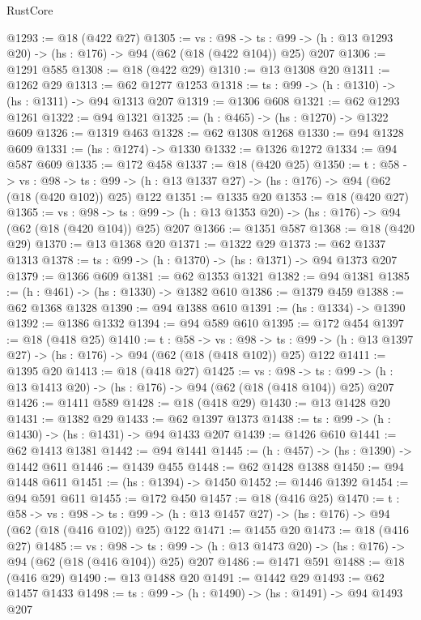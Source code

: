 \begin{lexlean}{RustCore}
\begin{coremodule}
@1293 := @18 (@422 @27)
@1305 := {vs : @98} ->
  {ts : @99} -> (h : @13 @1293 @20) -> (hs : @176) -> @94 (@62 (@18 (@422 @104)) @25) @207
@1306 := @1291 @585
@1308 := @18 (@422 @29)
@1310 := @13 @1308 @20
@1311 := @1262 @29
@1313 := @62 @1277 @1253
@1318 := {ts : @99} -> (h : @1310) -> (hs : @1311) -> @94 @1313 @207
@1319 := @1306 @608
@1321 := @62 @1293 @1261
@1322 := @94 @1321
@1325 := (h : @465) -> (hs : @1270) -> @1322 @609
@1326 := @1319 @463
@1328 := @62 @1308 @1268
@1330 := @94 @1328 @609
@1331 := (hs : @1274) -> @1330
@1332 := @1326 @1272
@1334 := @94 @587 @609
@1335 := @172 @458
@1337 := @18 (@420 @25)
@1350 := {t : @58} ->
  {vs : @98} ->
  {ts : @99} -> (h : @13 @1337 @27) -> (hs : @176) -> @94 (@62 (@18 (@420 @102)) @25) @122
@1351 := @1335 @20
@1353 := @18 (@420 @27)
@1365 := {vs : @98} ->
  {ts : @99} -> (h : @13 @1353 @20) -> (hs : @176) -> @94 (@62 (@18 (@420 @104)) @25) @207
@1366 := @1351 @587
@1368 := @18 (@420 @29)
@1370 := @13 @1368 @20
@1371 := @1322 @29
@1373 := @62 @1337 @1313
@1378 := {ts : @99} -> (h : @1370) -> (hs : @1371) -> @94 @1373 @207
@1379 := @1366 @609
@1381 := @62 @1353 @1321
@1382 := @94 @1381
@1385 := (h : @461) -> (hs : @1330) -> @1382 @610
@1386 := @1379 @459
@1388 := @62 @1368 @1328
@1390 := @94 @1388 @610
@1391 := (hs : @1334) -> @1390
@1392 := @1386 @1332
@1394 := @94 @589 @610
@1395 := @172 @454
@1397 := @18 (@418 @25)
@1410 := {t : @58} ->
  {vs : @98} ->
  {ts : @99} -> (h : @13 @1397 @27) -> (hs : @176) -> @94 (@62 (@18 (@418 @102)) @25) @122
@1411 := @1395 @20
@1413 := @18 (@418 @27)
@1425 := {vs : @98} ->
  {ts : @99} -> (h : @13 @1413 @20) -> (hs : @176) -> @94 (@62 (@18 (@418 @104)) @25) @207
@1426 := @1411 @589
@1428 := @18 (@418 @29)
@1430 := @13 @1428 @20
@1431 := @1382 @29
@1433 := @62 @1397 @1373
@1438 := {ts : @99} -> (h : @1430) -> (hs : @1431) -> @94 @1433 @207
@1439 := @1426 @610
@1441 := @62 @1413 @1381
@1442 := @94 @1441
@1445 := (h : @457) -> (hs : @1390) -> @1442 @611
@1446 := @1439 @455
@1448 := @62 @1428 @1388
@1450 := @94 @1448 @611
@1451 := (hs : @1394) -> @1450
@1452 := @1446 @1392
@1454 := @94 @591 @611
@1455 := @172 @450
@1457 := @18 (@416 @25)
@1470 := {t : @58} ->
  {vs : @98} ->
  {ts : @99} -> (h : @13 @1457 @27) -> (hs : @176) -> @94 (@62 (@18 (@416 @102)) @25) @122
@1471 := @1455 @20
@1473 := @18 (@416 @27)
@1485 := {vs : @98} ->
  {ts : @99} -> (h : @13 @1473 @20) -> (hs : @176) -> @94 (@62 (@18 (@416 @104)) @25) @207
@1486 := @1471 @591
@1488 := @18 (@416 @29)
@1490 := @13 @1488 @20
@1491 := @1442 @29
@1493 := @62 @1457 @1433
@1498 := {ts : @99} -> (h : @1490) -> (hs : @1491) -> @94 @1493 @207

\end{coremodule}
\end{lexlean}
